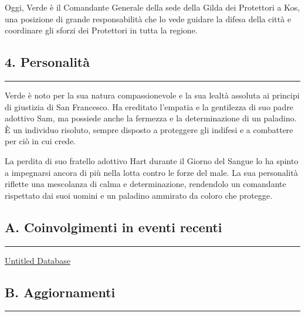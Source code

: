 Oggi, Verde è il Comandante Generale della sede della Gilda dei
Protettori a Kos, una posizione di grande responsabilità che lo vede
guidare la difesa della città e coordinare gli sforzi dei Protettori in
tutta la regione.

\subsection{4. Personalità}\label{personalituxe0}

\begin{center}\rule{0.5\linewidth}{0.5pt}\end{center}

Verde è noto per la sua natura compassionevole e la sua lealtà assoluta
ai principi di giustizia di San Francesco. Ha ereditato l'empatia e la
gentilezza di suo padre adottivo Sam, ma possiede anche la fermezza e la
determinazione di un paladino. È un individuo risoluto, sempre disposto
a proteggere gli indifesi e a combattere per ciò in cui crede.

La perdita di suo fratello adottivo Hart durante il Giorno del Sangue lo
ha spinto a impegnarsi ancora di più nella lotta contro le forze del
male. La sua personalità riflette una mescolanza di calma e
determinazione, rendendolo un comandante rispettato dai suoi uomini e un
paladino ammirato da coloro che protegge.

\subsection{A. Coinvolgimenti in eventi
recenti}\label{a.-coinvolgimenti-in-eventi-recenti}

\begin{center}\rule{0.5\linewidth}{0.5pt}\end{center}

\href{Untitled\%20Database\%2017d2e2b7db1d496f86b6dc2194d49887.csv}{Untitled
Database}

\subsection{B. Aggiornamenti}\label{b.-aggiornamenti}

\begin{center}\rule{0.5\linewidth}{0.5pt}\end{center}

\href{Untitled\%208c0a76f795b04cc580c646bb9b99fbb7.csv}{}
